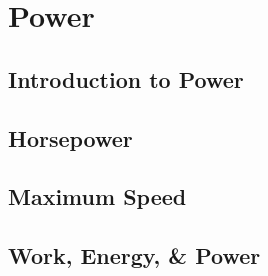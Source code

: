 \documentclass[../maths.tex]{subfiles}
\begin{document}
\chapter{Power}
\section{Introduction to Power}
\section{Horsepower}
\section{Maximum Speed}
\section{Work, Energy, \& Power}
\end{document}
